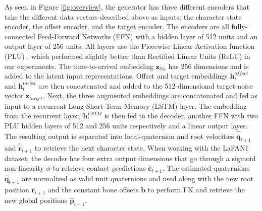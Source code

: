 \documentclass[acmtog]{acmart}
\newcommand{\bp}{\textbf{p}}
\newcommand{\bc}{\textbf{c}}
\newcommand{\bz}{\textbf{z}}
\newcommand{\bq}{\textbf{q}}
\newcommand{\br}{\textbf{r}}
\newcommand{\bb}{\textbf{b}}
\newcommand{\bh}{\textbf{h}}
\begin{document}
As seen in Figure \ref{fig:overview}, the generator has three different encoders that take the different data vectors described above as inputs; the character state encoder, the offset encoder, and the target encoder. The encoders are all fully-connected Feed-Forward Networks (FFN) with a hidden layer of 512 units and an output layer of 256 units. All layers use the Piecewise Linear Activation function (PLU) \cite{nicolae2018plu}, which performed slightly better than Rectified Linear Units (ReLU) in our experiments. The time-to-arrival embedding $\bz_{tta}$ has 256 dimensions and is added to the latent input representations. 
Offset and target embeddings $\bh_t^{\mathit{offset}}$ and $\bh_t^{\mathit{target}}$ are then concatenated and added to the 512-dimensional target-noise vector $\bz_{\mathit{target}}$. 
Next, the three augmented embeddings are concatenated and fed as input to a recurrent Long-Short-Term-Memory (LSTM) layer. The embedding from the recurrent layer, $\bh_t^{\mathit{LSTM}}$ is then fed to the decoder, another FFN with two PLU hidden layers of 512 and 256 units respectively and a linear output layer. The resulting output is separated into local-quaternion and root velocities $\hat{\dot{\bq}}_{t+1}$ and $\hat{\dot{\br}}_{t+1}$ to retrieve the next character state. When working with the LaFAN1 dataset, the decoder has four extra output dimensions that go through a sigmoid non-linearity $\phi$ to retrieve contact predictions $\hat{\bc}_{t+1}$.
The estimated quaternions $\hat{\bq}_{t+1}$ are normalized as valid unit quaternions and used along with the new root position $\hat{\br}_{t+1}$ and the constant bone offsets $\bb$ to perform FK and retrieve the new global positions $\hat{\bp}_{t+1}$.
\end{document}
